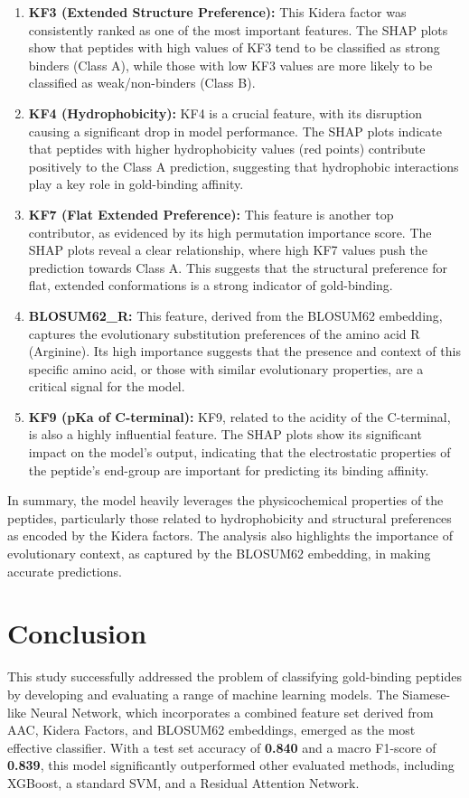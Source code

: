 \documentclass{article}
\begin{document}
\begin{enumerate}
    \item \textbf{KF3 (Extended Structure Preference):} This Kidera factor was consistently ranked as one of the most important features. The SHAP plots show that peptides with high values of KF3 tend to be classified as strong binders (Class A), while those with low KF3 values are more likely to be classified as weak/non-binders (Class B).
    \item \textbf{KF4 (Hydrophobicity):} KF4 is a crucial feature, with its disruption causing a significant drop in model performance. The SHAP plots indicate that peptides with higher hydrophobicity values (red points) contribute positively to the Class A prediction, suggesting that hydrophobic interactions play a key role in gold-binding affinity.
    \item \textbf{KF7 (Flat Extended Preference):} This feature is another top contributor, as evidenced by its high permutation importance score. The SHAP plots reveal a clear relationship, where high KF7 values push the prediction towards Class A. This suggests that the structural preference for flat, extended conformations is a strong indicator of gold-binding.
    \item \textbf{BLOSUM62\_R:} This feature, derived from the BLOSUM62 embedding, captures the evolutionary substitution preferences of the amino acid R (Arginine). Its high importance suggests that the presence and context of this specific amino acid, or those with similar evolutionary properties, are a critical signal for the model.
    \item \textbf{KF9 (pKa of C-terminal):} KF9, related to the acidity of the C-terminal, is also a highly influential feature. The SHAP plots show its significant impact on the model's output, indicating that the electrostatic properties of the peptide's end-group are important for predicting its binding affinity.
\end{enumerate}

In summary, the model heavily leverages the physicochemical properties of the peptides, particularly those related to hydrophobicity and structural preferences as encoded by the Kidera factors. The analysis also highlights the importance of evolutionary context, as captured by the BLOSUM62 embedding, in making accurate predictions.

\section{Conclusion}
This study successfully addressed the problem of classifying gold-binding peptides by developing and evaluating a range of machine learning models. The Siamese-like Neural Network, which incorporates a combined feature set derived from AAC, Kidera Factors, and BLOSUM62 embeddings, emerged as the most effective classifier. With a test set accuracy of \textbf{0.840} and a macro F1-score of \textbf{0.839}, this model significantly outperformed other evaluated methods, including XGBoost, a standard SVM, and a Residual Attention Network.
\end{document}
